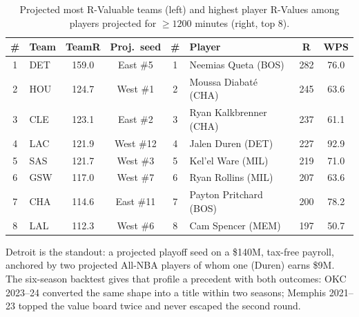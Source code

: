 \documentclass[11pt]{article}
\begin{document}
\begin{table}[h]\centering
\caption{Projected most R-Valuable teams (left) and highest player R-Values
among players projected for $\ge 1200$ minutes (right, top 8).}
\small
\begin{tabular}{clcc@{\hspace{24pt}}clcc}
\toprule
\# & Team & TeamR & Proj.\ seed & \# & Player & R & WPS \\
\midrule
1 & DET & 159.0 & East \#5  & 1 & Neemias Queta (BOS)      & 282 & 76.0 \\
2 & HOU & 124.7 & West \#1  & 2 & Moussa Diabat\'e (CHA)   & 245 & 63.6 \\
3 & CLE & 123.1 & East \#2  & 3 & Ryan Kalkbrenner (CHA)   & 237 & 61.1 \\
4 & LAC & 121.9 & West \#12 & 4 & Jalen Duren (DET)        & 227 & 92.9 \\
5 & SAS & 121.7 & West \#3  & 5 & Kel'el Ware (MIL)        & 219 & 71.0 \\
6 & GSW & 117.0 & West \#7  & 6 & Ryan Rollins (MIL)       & 207 & 63.6 \\
7 & CHA & 114.6 & East \#11 & 7 & Payton Pritchard (BOS)   & 200 & 78.2 \\
8 & LAL & 112.3 & West \#6  & 8 & Cam Spencer (MEM)        & 197 & 50.7 \\
\bottomrule
\end{tabular}
\end{table}

Detroit is the standout: a projected playoff seed on a \$140M, tax-free
payroll, anchored by two projected All-NBA players of whom one (Duren) earns
\$9M. The six-season backtest gives that profile a precedent with both
outcomes: OKC 2023--24 converted the same shape into a title within two
seasons; Memphis 2021--23 topped the value board twice and never escaped the
second round.
\end{document}
